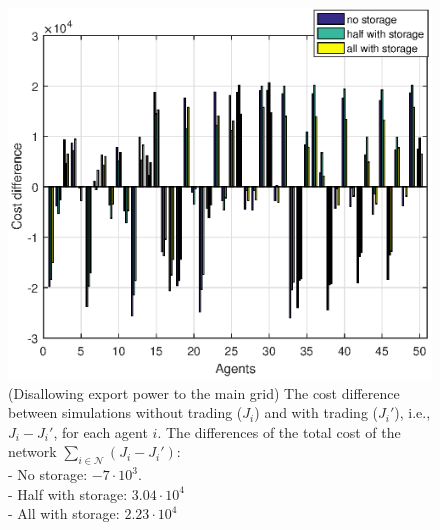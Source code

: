 \documentclass[10pt]{article}
\newtheorem{definitiox	n}{Definition}{\it}{}
\newcommand{\0}{\mathbf{0}}
\newcommand{\1}{\mathbf{1}}
\begin{document}
\begin{figure}[h]
	\centering
	\includegraphics[width=1\linewidth]{simA_cost_2.eps}
	\caption{(Disallowing export power to the main grid) The cost difference between simulations without trading ($J_i$) and with trading ($J_i'$), i.e., $J_i-J_i'$, for each agent $i$. The differences of the total cost of the network $\sum_{i \in \mathcal N} (J_i-J_i')$:\\
			- No storage: $-7\cdot10^3$.\\ 
			- Half with storage: $3.04\cdot 10^4$\\
			- All with storage: $2.23 \cdot 10^4$
	}
\end{figure}

%
%
\end{document}
